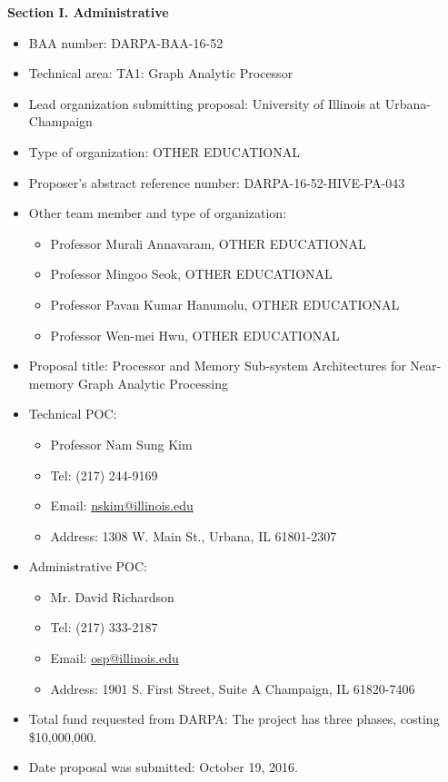 \documentclass[12pt]{article}
\begin{document}
\thispagestyle{empty}
\begin{comment}
\begin{center}
{\large \bfseries APaC: Adaptive Pricing and Coding for Dispersed Computing}

\vspace{0.2in}

{\large \bfseries Volume 1: Technical and Management Proposal}

\vspace{0.2in}

{\large \bfseries Cover Sheet} 
\end{center}
\end{comment}
\noindent 
{\large \bfseries Section I. Administrative}

\begin{itemize}
\item BAA number: DARPA-BAA-16-52
\item Technical area: TA1: Graph Analytic Processor
\item Lead organization submitting proposal: University of Illinois at Urbana-Champaign
\item Type of organization: OTHER EDUCATIONAL
\item Proposer’s abstract reference number: DARPA-16-52-HIVE-PA-043
\item Other team member and type of organization: 
\begin{itemize}
\item Professor Murali Annavaram, OTHER EDUCATIONAL
\item Professor Mingoo Seok, OTHER EDUCATIONAL
\item Professor Pavan Kumar Hanumolu, OTHER EDUCATIONAL
\item Professor Wen-mei Hwu, OTHER EDUCATIONAL
\end{itemize}
\item Proposal title: Processor and Memory Sub-system Architectures for Near-memory Graph Analytic Processing
\item Technical POC: 
\begin{itemize}
\item Professor Nam Sung Kim
\item Tel: (217) 244-9169
\item Email: \url{nskim@illinois.edu}
\item Address: 1308 W. Main St., Urbana, IL 61801-2307
\end{itemize}
\item Administrative POC: 
\begin{itemize}
\item Mr. David Richardson
\item Tel: (217) 333-2187
\item Email: \url{osp@illinois.edu}
\item Address: 1901 S. First Street, Suite A Champaign, IL 61820-7406
\end{itemize}
\item Total fund requested from DARPA: The project has three phases, costing \$10,000,000.
\item Date proposal was submitted: October 19, 2016.
\end{itemize}
\end{document}
